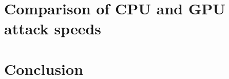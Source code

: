 \documentclass[12pt,oneside]{fithesis2}
\begin{document}
    \chapter{Comparison of CPU and GPU attack speeds}
    \chapter{Conclusion}
    

    
    
    
    
    
\end{document}
